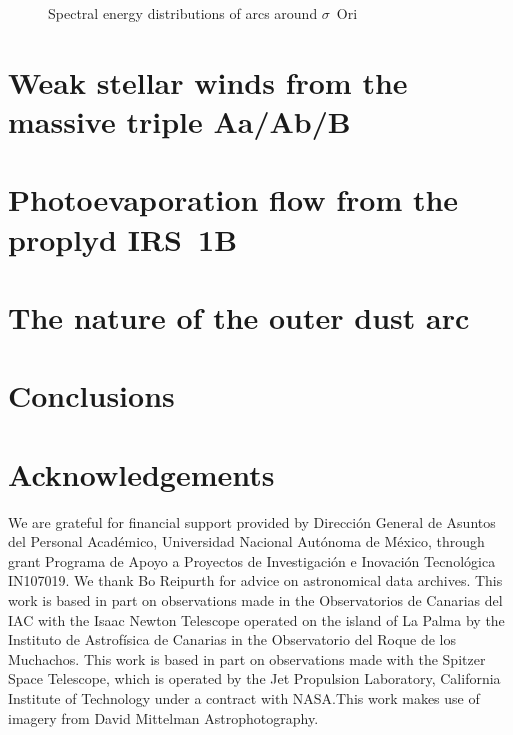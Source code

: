\documentclass[useAMS, usenatbib, a4paper]{mnras}
\begin{document}
\begin{figure}
  \centering
  \caption{Spectral energy distributions of arcs around $\sigma$~Ori}
  \label{fig:sig-ori-SED}
\end{figure}



\section{Weak stellar winds from the massive triple Aa/Ab/B}
\label{sec:stellar-winds-AB}

\section{Photoevaporation flow from the proplyd IRS~1B}
\label{sec:phot-flow-from}

\section{The nature of the outer dust arc}

\section{Conclusions}
\label{sec:conclusions}

\section*{Acknowledgements}

We are grateful for financial support provided by Dirección General de
Asuntos del Personal Académico, Universidad Nacional Autónoma de
México, through grant Programa de Apoyo a Proyectos de Investigación e
Inovación Tecnológica IN107019.  We thank Bo Reipurth for advice on
astronomical data archives.  This work is based in part on
observations made in the Observatorios de Canarias del IAC with the
Isaac Newton Telescope operated on the island of La Palma by the
Instituto de Astrofísica de Canarias in the Observatorio del Roque de
los Muchachos. 
This work is based in part on observations made with the Spitzer Space
Telescope, which is operated by the Jet Propulsion Laboratory,
California Institute of Technology under a contract with NASA.\@ This
work makes use of imagery from David Mittelman Astrophotography.




\bsp	%
\label{lastpage}
\end{document}
